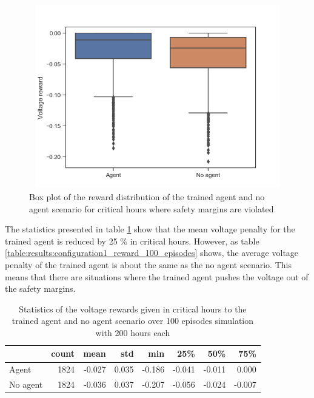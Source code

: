 \documentclass[class=book, crop=false]{standalone}
\begin{document}
\begin{figure}[H]
    \center
\includegraphics[height=8cm, width=12cm]{figures/config1_voltage_boxplot.png}
    \caption[size = 9]{Box plot of the reward distribution of the trained agent and no agent scenario for critical hours where safety margins are violated}
    \label{fig:results:config1_voltage_boxplot}
\end{figure}

The statistics presented in table \ref{table:results:configuration1_reward_100_ep_preventive} show that the mean voltage penalty for the trained agent is reduced by 25 \% in critical hours. However, as table
\ref{table:results:configuration1_reward_100_episodes} shows, the average voltage penalty of the trained agent is about the same as the no agent scenario. This means that there are situations where the trained agent pushes the voltage out of the safety margins.    


\begin{table}[ht]
\center
\begin{tabular}{l|rrrrrrr}
         & count & mean   & std   & min    & 25\%   & 50\%   & 75\%   \\
\hline
Agent    & 1824 & -0.027 & 0.035 & -0.186 & -0.041 & -0.011 & 0.000  \\
No agent & 1824 & -0.036 & 0.037 & -0.207 & -0.056 & -0.024 & -0.007 \\
\hline
\end{tabular}
\caption{Statistics of the voltage rewards given in critical hours to the trained agent and no agent scenario over 100 episodes simulation with 200 hours each}
\label{table:results:configuration1_reward_100_ep_preventive}
\end{table}
\end{document}
